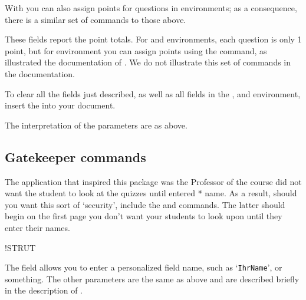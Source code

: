 \documentclass{article}
\makeatletter
\def\heshe{\@ifstar{\heshei}{\global\advance\hesheCnt1\relax\heshei}}
\def\heshei{\ifodd\hesheCnt she\else he\fi}
\def\hisher{\@ifstar{\hisheri}{\global\advance\hesheCnt1\relax\hisheri}}
\def\hisheri{\ifodd\hesheCnt her\else his\fi}
\makeatother
\begin{document}
\newtopic With  you can also assign points for questions in  environments; as a consequence, there is
a similar set of commands to those above.
\bVerb{}%
\begin{dCmd}[commandchars=!()]{\bxSize}
\end{dCmd}
\eVerb These fields report the point totals. For  and  environments, each question is only 1 point, but
for  environment you can assign points using the  command, as illustrated the documentation of \AEB. We do not illustrate
this set of commands in the documentation.

To clear all the fields just described, as well as all fields in the ,  and
 environment, insert the  into your document.
\bVerb{}%
\begin{dCmd}[commandchars=!()]{\bxSize}
\end{dCmd}
\eVerb The interpretation of the parameters are as above.


\subsection{Gatekeeper commands}

The application that inspired this package was the Professor of the course did not want the student to look at the quizzes
until {\heshe} entered {\hisher*} name. As a result, should you want this sort of `security', include the 
and  commands. The latter should begin on the first page you don't want your students to look upon until
they enter their names.
\bVerb{}%
\begin{dCmd}[commandchars=!()]{\bxSize}
\BeginNoPeeking
!STRUT
\end{dCmd}
\eVerb The  field allows you to enter a personalized field name,
such as `\texttt{IhrName}', or something. The other parameters are the same
as above and are described briefly in the description of .
\end{document}
